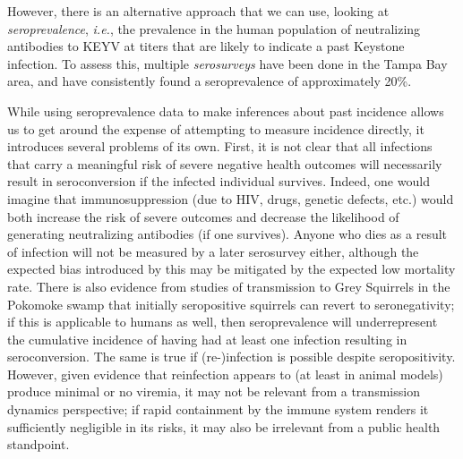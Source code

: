 \documentclass[12pt]{article}
\newcommand{\ie}{\textit{i.e.}}
\newcommand{\cjh}{\textcolor{blue}{cjh}}
\newcommand{\msg}[3]{(#1 $\rightarrow$ #2: #3)}
\newcommand{\mcc}[1]{\msg\cjh\cjh{#1}}
\begin{document}
        However, there is an alternative approach that we can use, looking at \textit{seroprevalence}, \ie, the prevalence in the human population of neutralizing antibodies to KEYV at titers that are likely to indicate a past Keystone infection. To assess this, multiple \textit{serosurveys} have been done in the Tampa Bay area, and have consistently found a seroprevalence of approximately 20\%\cite{parkin1972review}.%


        While using seroprevalence data to make inferences about past incidence allows us to get around the expense of attempting to measure incidence directly, it introduces several problems of its own. First, it is not clear that all infections that carry a meaningful risk of severe negative health outcomes will necessarily result in seroconversion if the infected individual survives. Indeed, one would imagine that immunosuppression (due to HIV, drugs, genetic defects, etc.) would both increase the risk of severe outcomes and decrease the likelihood of generating neutralizing antibodies (if one survives). Anyone who dies as a result of infection will not be measured by a later serosurvey either, although the expected bias introduced by this may be mitigated by the expected low mortality rate. There is also evidence from studies of transmission to Grey Squirrels in the Pokomoke swamp\cite{watts1988maintenance} that initially seropositive squirrels can revert to seronegativity; if this is applicable to humans as well, then seroprevalence will underrepresent the cumulative incidence of having had at least one infection resulting in seroconversion. The same is true if (re-)infection is possible despite seropositivity. However, given evidence that reinfection appears to (at least in animal models) produce minimal or no viremia\cite{watts1988maintenance,watts1979experimental}, it may not be relevant from a transmission dynamics perspective; if rapid containment by the immune system renders it sufficiently negligible in its risks, it may also be irrelevant from a public health standpoint. 
\end{document}
